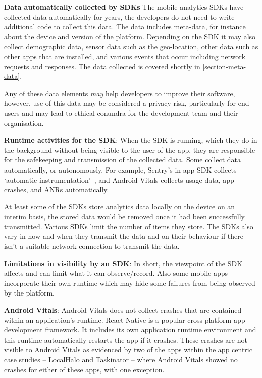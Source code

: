 \textbf{Data automatically collected by SDKs}
The mobile analytics SDKs have collected data automatically for years, the developers do not need to write additional code to collect this data. The data includes meta-data, for instance about the device and version of the platform. Depending on the SDK it may also collect demographic data, sensor data such as the geo-location, other data such as other apps that are installed, and various events that occur including network requests and responses. The data collected is covered shortly in \ref{section-meta-data}.

Any of these data elements \textit{may} help developers to improve their software, however, use of this data may be considered a privacy risk, particularly for end-users and may lead to ethical conundra for the development team and their organisation.

\textbf{Runtime activities for the SDK}: 
When the SDK is running, which they do in the background without being visible to the user of the app, they are responsible for the safekeeping and transmission of the collected data. Some collect data automatically, or autonomously. For example, Sentry's in-app SDK collects `automatic instrumentation'~\citep{sentry2021_mobile_vitals_four_metrics_every_mobile_developer_should_care_about}, and Android Vitals collects usage data, app crashes, and ANRs automatically.

At least some of the SDKs store analytics data locally on the device on an interim basis, the stored data would be removed once it had been successfully transmitted. Various SDKs limit the number of items they store. The SDKs also vary in how and when they transmit the data and on their behaviour if there isn't a suitable network connection to transmit the data.

\textbf{Limitations in visibility by an SDK}: 
In short, the viewpoint of the SDK affects and can limit what it can observe/record. Also some mobile apps incorporate their own runtime which may hide some failures from being observed by the platform.

\textbf{Android Vitals}: 
Android Vitals does not collect crashes that are contained within an application's runtime. React-Native is a popular cross-platform app development framework. It includes its own application runtime environment and this runtime automatically restarts the app if it crashes. These crashes are not visible to Android Vitals as evidenced by two of the apps within the app centric case studies -- LocalHalo and Taskinator -- where Android Vitals showed no crashes for either of these apps, with one exception. 


